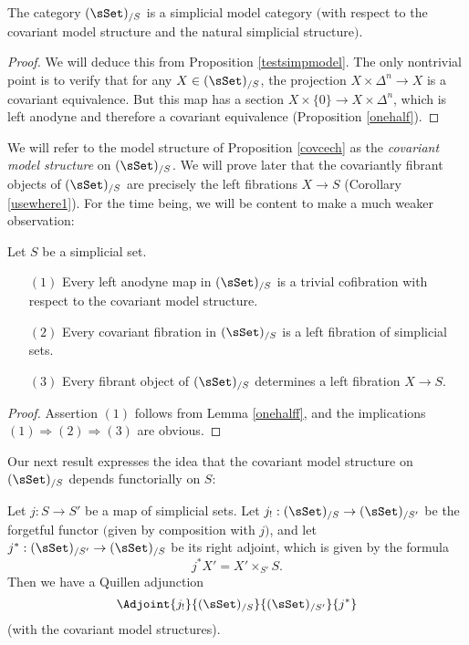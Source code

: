 \begin{proposition}\label{natsim}
The category $(\sSet)_{/S}$ is a simplicial model category $($with respect to the covariant model structure and the natural simplicial structure$)$.
\end{proposition}

\begin{proof}
We will deduce this from Proposition \ref{testsimpmodel}. The only nontrivial point is to verify that for any $X \in (\sSet)_{/S}$, the projection $X \times \Delta^n \rightarrow X$ is a covariant equivalence. But this map has a section $X \times \{0\} \rightarrow X \times \Delta^n$, which is left anodyne and therefore a covariant equivalence (Proposition \ref{onehalf}).
\end{proof}

We will refer to the model structure of Proposition \ref{covcech} as the {\it covariant model structure} on $(\sSet)_{/S}$. We will prove later that the covariantly fibrant objects of $(\sSet)_{/S}$ are precisely the left fibrations $X \rightarrow S$ (Corollary \ref{usewhere1}). For the time being, we will be content to make a much weaker observation:

\begin{proposition}\label{onehalf}
Let $S$ be a simplicial set.
\begin{itemize}
\item[$(1)$] Every left anodyne map in $(\sSet)_{/S}$ is a trivial cofibration with respect to the covariant model structure.
\item[$(2)$] Every covariant fibration in $(\sSet)_{/S}$ is a left fibration of simplicial sets.
\item[$(3)$] Every fibrant object of $(\sSet)_{/S}$ determines a left fibration $X \rightarrow S$.
\end{itemize}
\end{proposition}

\begin{proof}
Assertion $(1)$ follows from Lemma \ref{onehalff}, and 
the implications $(1) \Rightarrow (2) \Rightarrow (3)$ are obvious.
\end{proof}

Our next result expresses the idea that the covariant model structure on $(\sSet)_{/S}$ depends functorially on $S$:

\begin{proposition}\label{contrafunk}
Let $j: S \rightarrow S'$ be a map of simplicial sets. Let 
$j_{!}: (\sSet)_{/S} \rightarrow (\sSet)_{/S'}$ be the forgetful functor $($given by composition with
$j${}$)$, and let $j^{\ast}: (\sSet)_{/S'} \rightarrow (\sSet)_{/S}$ be its right adjoint, which is given by the formula
$$ j^{\ast} X' = X' \times_{S'} S.$$
Then we have a Quillen adjunction
$$ \Adjoint{ j_{!} }{ (\sSet)_{/S} }{ (\sSet)_{/S'}}{j^{\ast}}$$
(with the covariant model structures). 
\end{proposition}

